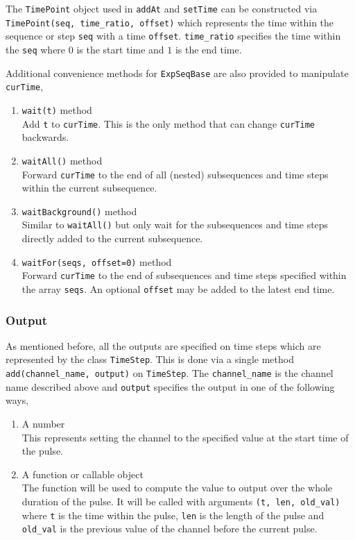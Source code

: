 The \verb`TimePoint` object used in \verb`addAt` and \verb`setTime`
can be constructed via \verb`TimePoint(seq, time_ratio, offset)`
which represents the time within the sequence or step \verb`seq` with a time \verb`offset`.
\verb`time_ratio` specifies the time within the \verb`seq` where $0$ is the start time
and $1$ is the end time.

Additional convenience methods for \verb`ExpSeqBase` are also provided
to manipulate \verb`curTime`,
\begin{enumerate}
\item \verb`wait(t)` method\\
  Add \verb`t` to \verb`curTime`.
  This is the only method that can change \verb`curTime` backwards.
\item \verb`waitAll()` method\\
  Forward \verb`curTime` to the end of all (nested) subsequences and time steps
  within the current subsequence.
\item \verb`waitBackground()` method\\
  Similar to \verb`waitAll()` but only wait for the subsequences and time steps
  directly added to the current subsequence.
\item \verb`waitFor(seqs, offset=0)` method\\
  Forward \verb`curTime` to the end of subsequences and time steps specified
  within the array \verb`seqs`.
  An optional \verb`offset` may be added to the latest end time.
\end{enumerate}

\subsubsection{Output}

As mentioned before, all the outputs are specified on time steps
which are represented by the class \verb`TimeStep`.
This is done via a single method \verb`add(channel_name, output)` on \verb`TimeStep`.
The \verb`channel_name` is the channel name described above
and \verb`output` specifies the output in one of the following ways,
\begin{enumerate}
\item A number\\
  This represents setting the channel to the specified value at the start time of the pulse.
\item A function or callable object\\
  The function will be used to compute the value to output over the whole duration of the pulse.
  It will be called with arguments \verb`(t, len, old_val)` where
  \verb`t` is the time within the pulse, \verb`len` is the length of the pulse
  and \verb`old_val` is the previous value of the channel before the current pulse.
\end{enumerate}


